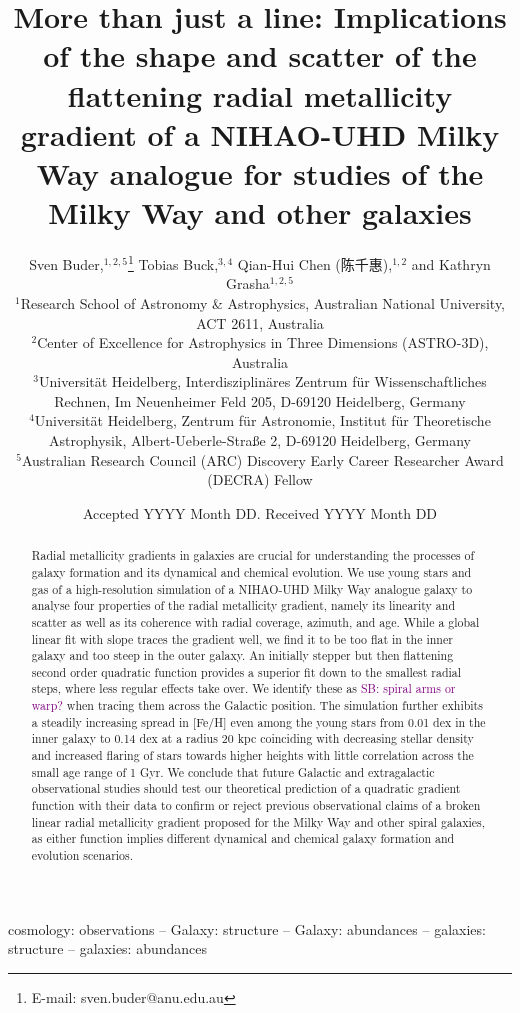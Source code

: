 \documentclass[fleqn,usenatbib]{mnras}
\title[Radial metallicity gradients in NIHAO-UHD]{More than just a line: Implications of the shape and scatter of the flattening radial metallicity gradient of a NIHAO-UHD Milky Way analogue for studies of the Milky Way and other galaxies}
\author[S. Buder et al.]{
Sven Buder,$^{1,2,5}$\thanks{E-mail: sven.buder@anu.edu.au}
Tobias Buck,$^{3,4}$
Qian-Hui Chen (陈千惠),$^{1,2}$ and
Kathryn Grasha$^{1,2,5}$
\\
$^{1}$Research School of Astronomy \& Astrophysics, Australian National University, ACT 2611, Australia\\
$^{2}$Center of Excellence for Astrophysics in Three Dimensions (ASTRO-3D), Australia\\
$^{3}$Universit{\"a}t Heidelberg, Interdisziplin{\"a}res Zentrum f{\"u}r Wissenschaftliches Rechnen, Im Neuenheimer Feld 205, D-69120 Heidelberg, Germany\\
$^{4}$Universit{\"a}t Heidelberg, Zentrum f{\"u}r Astronomie, Institut f{\"u}r Theoretische Astrophysik, Albert-Ueberle-Straße 2, D-69120 Heidelberg, Germany\\
$^{5}$Australian Research Council (ARC) Discovery Early Career Researcher Award (DECRA) Fellow
}
\date{Accepted YYYY Month DD. Received YYYY Month DD}
\newcommand{\SB}[1]{{\textcolor{purple}{SB: #1}}}
\begin{document}
\label{firstpage}
\pagerange{\pageref{firstpage}--\pageref{lastpage}}
\begin{CJK}{UTF8}{gbsn}
\maketitle
\end{CJK}

\begin{abstract} %
Radial metallicity gradients in galaxies are crucial for understanding the processes of galaxy formation and its dynamical and chemical evolution.
We use young stars and gas of a high-resolution simulation of a NIHAO-UHD Milky Way analogue galaxy to analyse four properties of the radial metallicity gradient, namely its linearity and scatter as well as its coherence with radial coverage, azimuth, and age.
While a global linear fit with slope traces the gradient well, we find it to be too flat in the inner galaxy and too steep in the outer galaxy. An initially stepper but then flattening second order quadratic function provides a superior fit down to the smallest radial steps, where less regular effects take over. We identify these as \SB{spiral arms or warp?} when tracing them across the Galactic position. The simulation further exhibits a steadily increasing spread in [Fe/H] even among the young stars from 0.01 dex in the inner galaxy to 0.14 dex at a radius 20 kpc coinciding with decreasing stellar density and increased flaring of stars towards higher heights with little correlation across the small age range of 1 Gyr.
We conclude that future Galactic and extragalactic observational studies should test our theoretical prediction of a quadratic gradient function with their data to confirm or reject previous observational claims of a broken linear radial metallicity gradient proposed for the Milky Way and other spiral galaxies, as either function implies different dynamical and chemical galaxy formation and evolution scenarios.
\end{abstract}
\begin{keywords}
cosmology: observations -- Galaxy: structure -- Galaxy: abundances  -- galaxies: structure -- galaxies: abundances
\end{keywords}

\end{document}
